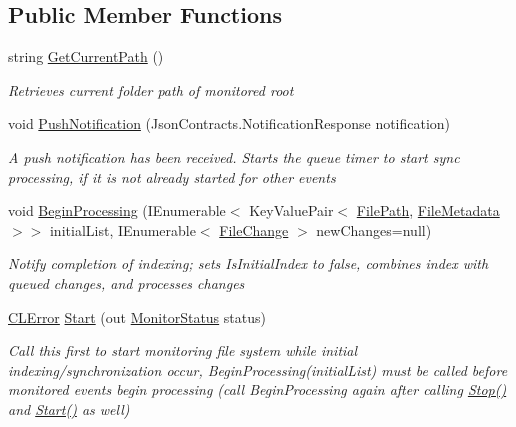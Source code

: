 \subsection*{Public Member Functions}
\begin{DoxyCompactItemize}
\item 
string \hyperlink{class_cloud_api_public_1_1_file_monitor_1_1_monitor_agent_a4f8355a65a49af520f5bad5e012d6005}{Get\-Current\-Path} ()
\begin{DoxyCompactList}\small\item\em Retrieves current folder path of monitored root \end{DoxyCompactList}\item 
void \hyperlink{class_cloud_api_public_1_1_file_monitor_1_1_monitor_agent_a75c1ea853f4abeb5de7f9b35f580ec15}{Push\-Notification} (Json\-Contracts.\-Notification\-Response notification)
\begin{DoxyCompactList}\small\item\em A push notification has been received. Starts the queue timer to start sync processing, if it is not already started for other events \end{DoxyCompactList}\item 
void \hyperlink{class_cloud_api_public_1_1_file_monitor_1_1_monitor_agent_af6a13b7d0c183eda555e669a90e3f122}{Begin\-Processing} (I\-Enumerable$<$ Key\-Value\-Pair$<$ \hyperlink{class_cloud_api_public_1_1_model_1_1_file_path}{File\-Path}, \hyperlink{class_cloud_api_public_1_1_model_1_1_file_metadata}{File\-Metadata} $>$$>$ initial\-List, I\-Enumerable$<$ \hyperlink{class_cloud_api_public_1_1_model_1_1_file_change}{File\-Change} $>$ new\-Changes=null)
\begin{DoxyCompactList}\small\item\em Notify completion of indexing; sets Is\-Initial\-Index to false, combines index with queued changes, and processes changes \end{DoxyCompactList}\item 
\hyperlink{class_cloud_api_public_1_1_model_1_1_c_l_error}{C\-L\-Error} \hyperlink{class_cloud_api_public_1_1_file_monitor_1_1_monitor_agent_a7fd0bcb1837d5a27a32385232f6f463b}{Start} (out \hyperlink{namespace_cloud_api_public_1_1_static_a31db95951688473984962a22ad05a45f}{Monitor\-Status} status)
\begin{DoxyCompactList}\small\item\em Call this first to start monitoring file system while initial indexing/synchronization occur, Begin\-Processing(initial\-List) must be called before monitored events begin processing (call Begin\-Processing again after calling \hyperlink{class_cloud_api_public_1_1_file_monitor_1_1_monitor_agent_ae9123602c7ba50f698e71b6904ba8cb6}{Stop()} and \hyperlink{class_cloud_api_public_1_1_file_monitor_1_1_monitor_agent_a7fd0bcb1837d5a27a32385232f6f463b}{Start()} as well) \end{DoxyCompactList}\item 
$$
\end{DoxyCompactItemize}
